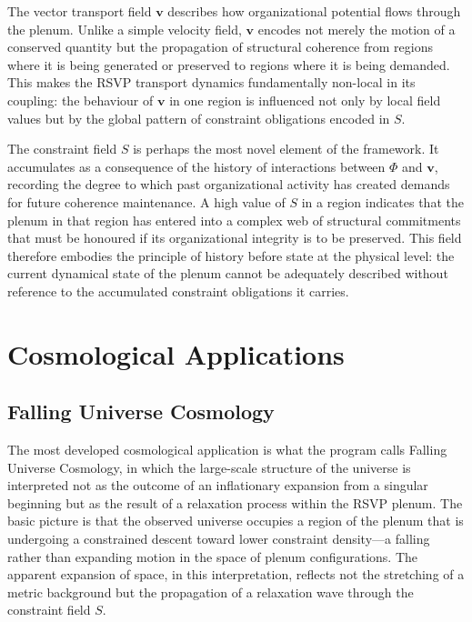 \documentclass[11pt, oneside]{book}
\theoremstyle{definition}
\theoremstyle{remark}
\begin{document}
The vector transport field $\mathbf{v}$ describes how organizational potential flows through the plenum. Unlike a simple velocity field, $\mathbf{v}$ encodes not merely the motion of a conserved quantity but the propagation of structural coherence from regions where it is being generated or preserved to regions where it is being demanded. This makes the RSVP transport dynamics fundamentally non-local in its coupling: the behaviour of $\mathbf{v}$ in one region is influenced not only by local field values but by the global pattern of constraint obligations encoded in $S$.

The constraint field $S$ is perhaps the most novel element of the framework. It accumulates as a consequence of the history of interactions between $\Phi$ and $\mathbf{v}$, recording the degree to which past organizational activity has created demands for future coherence maintenance. A high value of $S$ in a region indicates that the plenum in that region has entered into a complex web of structural commitments that must be honoured if its organizational integrity is to be preserved. This field therefore embodies the principle of history before state at the physical level: the current dynamical state of the plenum cannot be adequately described without reference to the accumulated constraint obligations it carries.

\section{Cosmological Applications}

\subsection{Falling Universe Cosmology}

The most developed cosmological application is what the program calls Falling Universe Cosmology, in which the large-scale structure of the universe is interpreted not as the outcome of an inflationary expansion from a singular beginning but as the result of a relaxation process within the RSVP plenum. The basic picture is that the observed universe occupies a region of the plenum that is undergoing a constrained descent toward lower constraint density—a falling rather than expanding motion in the space of plenum configurations. The apparent expansion of space, in this interpretation, reflects not the stretching of a metric background but the propagation of a relaxation wave through the constraint field $S$.
\end{document}
